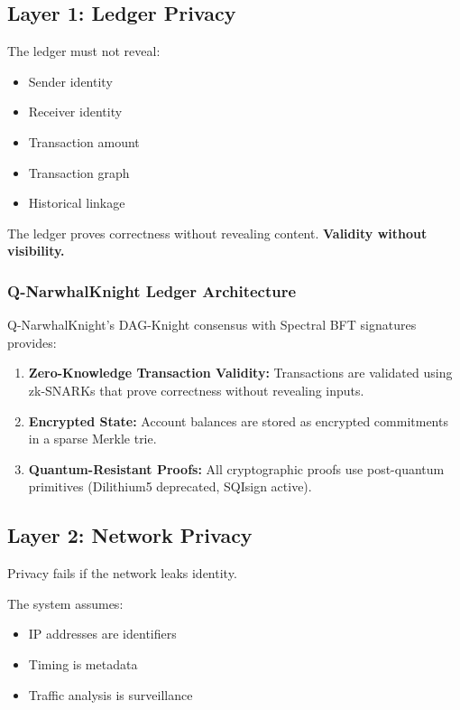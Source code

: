 \documentclass[12pt,a4paper]{article}
\begin{document}
\subsection{Layer 1: Ledger Privacy}

The ledger must not reveal:
\begin{itemize}
    \item Sender identity
    \item Receiver identity
    \item Transaction amount
    \item Transaction graph
    \item Historical linkage
\end{itemize}

The ledger proves correctness without revealing content. \textbf{Validity without visibility.}

\subsubsection{Q-NarwhalKnight Ledger Architecture}

Q-NarwhalKnight's DAG-Knight consensus with Spectral BFT signatures provides:

\begin{enumerate}
    \item \textbf{Zero-Knowledge Transaction Validity:} Transactions are validated using zk-SNARKs that prove correctness without revealing inputs.
    \item \textbf{Encrypted State:} Account balances are stored as encrypted commitments in a sparse Merkle trie.
    \item \textbf{Quantum-Resistant Proofs:} All cryptographic proofs use post-quantum primitives (Dilithium5 deprecated, SQIsign active).
\end{enumerate}

\subsection{Layer 2: Network Privacy}

Privacy fails if the network leaks identity.

The system assumes:
\begin{itemize}
    \item IP addresses are identifiers
    \item Timing is metadata
    \item Traffic analysis is surveillance
\end{itemize}
\end{document}
